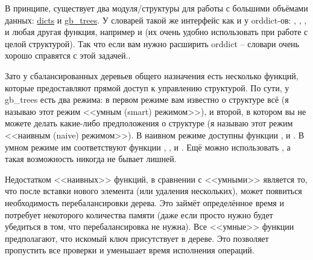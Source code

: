 В принципе, существует два модуля/структуры для работы с большими объёмами данных: \href{http://erldocs.com/R15B/stdlib/dict.html}{dicts} и \href{http://erldocs.com/R15B/stdlib/gb\_trees.html}{gb\_trees}.
У словарей такой же интерфейс как и у orddict\--ов: , , ,  и любая другая функция, например  и  (их очень удобно использовать при работе с целой структурой).
Так что если вам нужно расширить orddict \--- словари очень хорошо справятся с этой задачей..

Зато у сбалансированных деревьев общего назначения есть несколько функций, которые предоставляют прямой доступ к управлению структурой.
По сути, у gb\_trees есть два режима: в первом режиме вам известно о структуре всё (я называю этот режим <<умным (smart) режимом>>), и второй, в котором вы не можете делать какие\--либо предположения о структуре (я называю этот режим <<наивным (naive) режимом>>).
В наивном режиме доступны функции ,  и .
В умном режиме им соответствуют функции , ,  и .
Ещё можно использовать , а такая возможность никогда не бывает лишней.

Недостатком <<наивных>> функций, в сравнении с <<умными>> является то, что после вставки нового элемента (или удаления нескольких), может появиться необходимость перебалансировки дерева.
Это займёт определённое время и потребует некоторого количества памяти (даже если просто нужно будет убедиться в том, что перебалансировка не нужна).
Все <<умные>> функции предполагают, что искомый ключ присутствует в дереве.
Это позволяет пропустить все проверки и уменьшает время исполнения операций.

